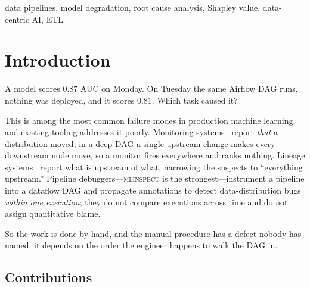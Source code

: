 \documentclass[conference]{IEEEtran}
\begin{document}
\begin{IEEEkeywords}
data pipelines, model degradation, root cause analysis, Shapley value, data-centric AI, ETL
\end{IEEEkeywords}

\section{Introduction}

A model scores $0.87$ AUC on Monday. On Tuesday the same Airflow DAG runs,
nothing was deployed, and it scores $0.81$. Which task caused it?

This is among the most common failure modes in production machine learning, and
existing tooling addresses it poorly. Monitoring systems~\cite{deequ} report
\emph{that} a distribution moved; in a deep DAG a single upstream change makes
every downstream node move, so a monitor fires everywhere and ranks nothing.
Lineage systems~\cite{openlineage} report what is upstream of what, narrowing the
suspects to ``everything upstream.'' Pipeline debuggers---\textsc{mlinspect}
\cite{mlinspect,mlinspectj} is the strongest---instrument a pipeline into a
dataflow DAG and propagate annotations to detect data-distribution bugs
\emph{within one execution}; they do not compare executions across time and do
not assign quantitative blame.

So the work is done by hand, and the manual procedure has a defect nobody has
named: it depends on the order the engineer happens to walk the DAG in.

\subsection{Contributions}
\end{document}
